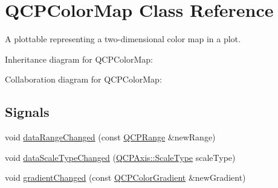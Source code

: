 \hypertarget{classQCPColorMap}{}\section{Q\+C\+P\+Color\+Map Class Reference}
\label{classQCPColorMap}


A plottable representing a two-\/dimensional color map in a plot.  




Inheritance diagram for Q\+C\+P\+Color\+Map\+:


Collaboration diagram for Q\+C\+P\+Color\+Map\+:
\subsection*{Signals}
\begin{DoxyCompactItemize}
\item 
void \hyperlink{classQCPColorMap_a83ae5be3903da493f732e1a5c14fd807}{data\+Range\+Changed} (const \hyperlink{classQCPRange}{Q\+C\+P\+Range} \&new\+Range)
\item 
void \hyperlink{classQCPColorMap_a978d5d5c9f68cffef8c902b855c04490}{data\+Scale\+Type\+Changed} (\hyperlink{classQCPAxis_a36d8e8658dbaa179bf2aeb973db2d6f0}{Q\+C\+P\+Axis\+::\+Scale\+Type} scale\+Type)
\item 
void \hyperlink{classQCPColorMap_a31a12726736b1ac274e7b1d8dfb67468}{gradient\+Changed} (const \hyperlink{classQCPColorGradient}{Q\+C\+P\+Color\+Gradient} \&new\+Gradient)
\end{DoxyCompactItemize}
